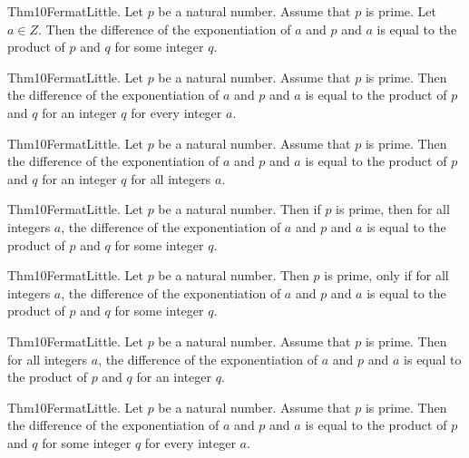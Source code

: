 \documentclass{article}
\begin{document}
Thm10FermatLittle. Let $p$ be a natural number. Assume that $p$ is prime. Let $a \in Z$. Then the difference of the exponentiation of $a$ and $p$ and $a$ is equal to the product of $p$ and $q$ for some integer $q$.

Thm10FermatLittle. Let $p$ be a natural number. Assume that $p$ is prime. Then the difference of the exponentiation of $a$ and $p$ and $a$ is equal to the product of $p$ and $q$ for an integer $q$ for every integer $a$.

Thm10FermatLittle. Let $p$ be a natural number. Assume that $p$ is prime. Then the difference of the exponentiation of $a$ and $p$ and $a$ is equal to the product of $p$ and $q$ for an integer $q$ for all integers $a$.

Thm10FermatLittle. Let $p$ be a natural number. Then if $p$ is prime, then for all integers $a$, the difference of the exponentiation of $a$ and $p$ and $a$ is equal to the product of $p$ and $q$ for some integer $q$.

Thm10FermatLittle. Let $p$ be a natural number. Then $p$ is prime, only if for all integers $a$, the difference of the exponentiation of $a$ and $p$ and $a$ is equal to the product of $p$ and $q$ for some integer $q$.

Thm10FermatLittle. Let $p$ be a natural number. Assume that $p$ is prime. Then for all integers $a$, the difference of the exponentiation of $a$ and $p$ and $a$ is equal to the product of $p$ and $q$ for an integer $q$.

Thm10FermatLittle. Let $p$ be a natural number. Assume that $p$ is prime. Then the difference of the exponentiation of $a$ and $p$ and $a$ is equal to the product of $p$ and $q$ for some integer $q$ for every integer $a$.
\end{document}
